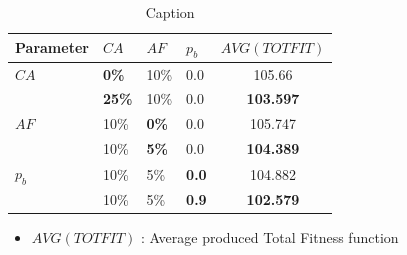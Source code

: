 \begin{table}
    \centering
    \begin{tabular}{|l|l|l|l||c|}
    \hline
    Parameter & $CA$ & $AF$ & $p_b$ & $AVG(TOTFIT)$ \\
    \hline
    $CA$ & \textbf{0\%} & 10\% & 0.0 & 105.66\\
    ~ & \textbf{25\%} & 10\% & 0.0 & \textbf{103.597}\\
    \hline
    $AF$ & 10\% & \textbf{0\%} & 0.0 & 105.747 \\
    ~ & 10\% & \textbf{5\%} & 0.0 & \textbf{104.389}\\
    \hline
    $p_b$ & 10\% & 5\% & \textbf{0.0} & 104.882\\
    ~ & 10\% & 5\% & \textbf{0.9} & \textbf{102.579}\\
    \hline
    \end{tabular}
    \caption {Caption}
    \tiny
    \begin{itemize}[noitemsep]
    \item[ ] $AVG(TOTFIT)$ : Average produced Total Fitness function
    \end{itemize}
    \label{table:pm2_inEvaluation}
\end{table}


